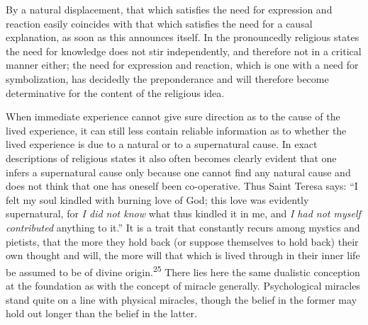 \documentclass[12pt,a4paper]{book}
\newcommand{\opage}[1]{\marginnote{\footnotesize\textit{[#1]}}}
\begin{document}
By a natural displacement, that which satisfies the need for expression and
reaction easily coincides with that which satisfies the need for a causal
explanation, as soon as this announces itself. In the pronouncedly religious
states the need for knowledge does not stir independently, and therefore not in
a critical manner either; the need for expression and reaction, which is one
with a need for symbolization, has decidedly the preponderance and will
therefore become determinative for the content of the religious idea.

When immediate experience cannot give sure direction as to the cause of the
lived experience, it can still less contain reliable information as to whether
the lived experience is due to a natural or to a supernatural cause. In exact
descriptions of religious states it also often becomes clearly evident that one
infers a supernatural cause only because one cannot find any natural cause and
does not think that one has oneself been 
\opage{59}co-operative. Thus Saint Teresa says:
``I felt my soul kindled with burning love of God; this love was evidently
supernatural, for \emph{I did not know} what thus kindled it in me, and
\emph{I had not myself contributed} anything to it.'' It is a trait that
constantly recurs among mystics and pietists, that the more they hold back (or
suppose themselves to hold back) their own thought and will, the more will that
which is lived through in their inner life be assumed to be of divine
origin.\textsuperscript{25} There lies here the same dualistic conception at
the foundation as with the concept of miracle generally. Psychological miracles
stand quite on a line with physical miracles, though the belief in the former
may hold out longer than the belief in the latter.

\medskip
\end{document}
